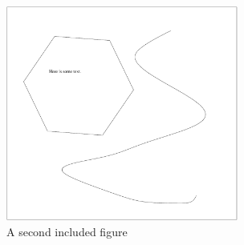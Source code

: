 \documentclass{article}
\begin{document}
\begin{figure}
  \begin{center}
     \includegraphics[width=3.0in]{something}
  \end{center}

  \caption{A second included figure}
  \label{fig:something}
\end{figure}
\end{document}
